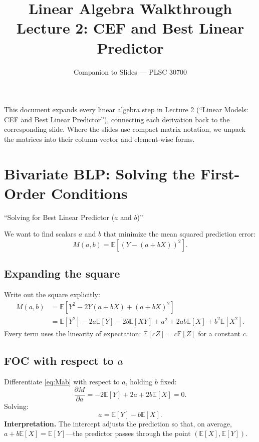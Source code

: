 \documentclass[12pt]{article}
\title{\textbf{Linear Algebra Walkthrough}\\[4pt]
\large Lecture 2: CEF and Best Linear Predictor}
\author{Companion to Slides --- PLSC 30700}
\date{}
\newcommand{\E}{\mathbb{E}}
\theoremstyle{definition}
\begin{document}
\maketitle
\thispagestyle{fancy}

\noindent This document expands every linear algebra step in Lecture 2 (``Linear Models: CEF and Best Linear Predictor''), connecting each derivation back to the corresponding slide. Where the slides use compact matrix notation, we unpack the matrices into their column-vector and element-wise forms.

\tableofcontents
\newpage

\section{Bivariate BLP: Solving the First-Order Conditions}
\label{sec:bivariate}

\begin{tcolorbox}[colback=blue!5, colframe=blue!50, title=Slide Reference]
``Solving for Best Linear Predictor ($a$ and $b$)''
\end{tcolorbox}

We want to find scalars $a$ and $b$ that minimize the mean squared prediction error:
\[
M(a,b) = \E\!\left[(Y - (a + bX))^2\right].
\]

\subsection{Expanding the square}

Write out the square explicitly:
\begin{align}
M(a,b) &= \E\!\left[Y^2 - 2Y(a+bX) + (a+bX)^2\right] \nonumber\\
&= \E[Y^2] - 2a\E[Y] - 2b\E[XY] + a^2 + 2ab\E[X] + b^2\E[X^2]. \label{eq:Mab}
\end{align}
Every term uses the linearity of expectation: $\E[cZ] = c\E[Z]$ for a constant $c$.

\subsection{FOC with respect to $a$}

Differentiate \eqref{eq:Mab} with respect to $a$, holding $b$ fixed:
\[
\frac{\partial M}{\partial a} = -2\E[Y] + 2a + 2b\E[X] = 0.
\]
Solving:
\begin{equation}
\boxed{a = \E[Y] - b\E[X].} \label{eq:astar}
\end{equation}
\textbf{Interpretation.}  The intercept adjusts the prediction so that, on average, $a + b\E[X] = \E[Y]$---the predictor passes through the point $(\E[X], \E[Y])$.
\end{document}

